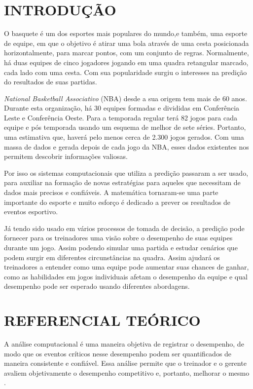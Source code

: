 \newpage
\section{INTRODUÇÃO}


O basquete é um dos esportes mais populares do mundo,e também,	 uma esporte de equipe, em que o objetivo é atirar uma bola através de uma cesta posicionada horizontalmente, para marcar pontos, com um conjunto de regras. Normalmente, há duas equipes de cinco jogadores jogando em uma quadra retangular marcado, cada lado com uma cesta. Com sua popularidade surgiu o interesses na predição do resultados de suas partidas. 


\textit{National Basketball Associativo} (NBA) desde a sua origem tem mais de 60 anos. Durante esta organização, há 30 equipes formadas e divididas em Conferência Leste e Conferência Oeste. Para a temporada regular terá 82 jogos para cada equipe e pós temporada usando um esquema de melhor de sete séries. Portanto, uma estimativa que, haverá pelo menos cerca de 2.300 jogos gerados. Com uma massa de dados e gerada depois de cada jogo da NBA, esses dados existentes nos permitem descobrir informações valiosas.

Por isso os sistemas computacionais que utiliza a predição passaram a ser usado, para auxiliar na formação de novas estratégias para aqueles que necessitam de dados mais precisos e confiáveis. A matemática tornaram-se uma parte importante do esporte e muito esforço é dedicado a prever os resultados de eventos esportivo.

Já tendo sido usado em vários processos de tomada de decisão, a predição pode fornecer para os treinadores uma visão sobre o desempenho de suas equipes durante um jogo. Assim podendo simular uma partida e estudar cenários que podem surgir em diferentes circunstâncias na quadra. Assim ajudará os treinadores a entender como uma equipe pode aumentar suas chances de ganhar, como as habilidades em jogos individuais afetam o desempenho da equipe e qual desempenho pode ser esperado usando diferentes abordagens.


\section{REFERENCIAL TEÓRICO}
A análise computacional é uma maneira objetiva de registrar o desempenho, de modo que os eventos críticos nesse desempenho podem ser quantificados de maneira consistente e confiável. Essa análise permite que o treinador e o gerente avaliem objetivamente o desempenho competitivo e, portanto, melhorar o mesmo \cite{Taylor2004}. 

